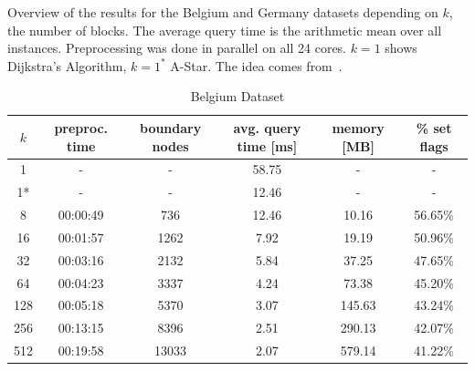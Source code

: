 \documentclass[acmsmall,nonacm,screen,review]{acmart}
\begin{document}
\begin{table}[bt!]
    \centering
    \caption{Overview of the results for the Belgium and Germany datasets depending on $k$, the number of blocks. The average query time is the arithmetic mean over all instances. Preprocessing was done in parallel on all 24 cores.
    $k=1$ shows Dijkstra's Algorithm, $k=1^*$ A-Star. The idea comes from~\cite{DBLP:conf/wea/GrossmannS0S23}.}
    \label{tab:experimental-results}
    \begin{subtable}{\textwidth} %
        \caption{Belgium Dataset}
        \begin{tabular}{|c|c|c|c|c|c|}
            \hline
            $k$ & preproc. time & boundary nodes & avg. query time [ms] & memory [MB] & \% set flags \\
            \hline
            1 & - & - & 58.75 & - & - \\
            1* & - & - & 12.46 & - & - \\
            8 & 00:00:49 & 736 & 12.46 & 10.16 & 56.65\% \\
            16 & 00:01:57 & 1262 & 7.92 & 19.19 & 50.96\% \\
            32 & 00:03:16 & 2132 & 5.84 & 37.25 & 47.65\% \\
            64 & 00:04:23 & 3337 & 4.24 & 73.38 & 45.20\% \\
            128 & 00:05:18 & 5370 & 3.07 & 145.63 & 43.24\% \\
            256 & 00:13:15 & 8396 & 2.51 & 290.13 & 42.07\% \\
            512 & 00:19:58 & 13033 & 2.07 & 579.14 & 41.22\% \\
            \hline
        \end{tabular}
    \end{subtable}

    \vspace{10pt} %


\end{table}
\end{document}
